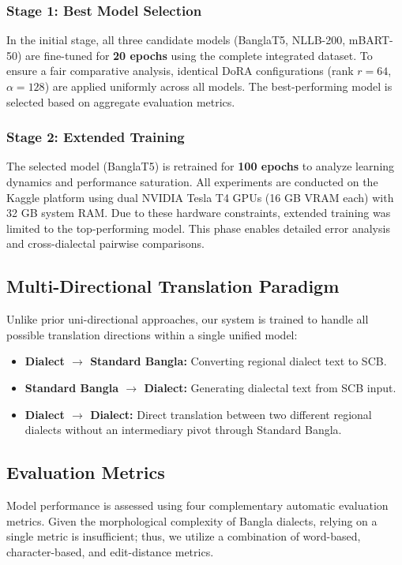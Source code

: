 \documentclass[12pt,a4paper]{article}
\begin{document}
\subsubsection{Stage 1: Best Model Selection}
In the initial stage, all three candidate models (BanglaT5, NLLB-200, mBART-50) are fine-tuned for \textbf{20 epochs} using the complete integrated dataset. To ensure a fair comparative analysis, identical DoRA configurations (rank $r = 64$, $\alpha = 128$) are applied uniformly across all models. The best-performing model is selected based on aggregate evaluation metrics.

\subsubsection{Stage 2: Extended Training}
The selected model (BanglaT5) is retrained for \textbf{100 epochs} to analyze learning dynamics and performance saturation. All experiments are conducted on the Kaggle platform using dual NVIDIA Tesla T4 GPUs (16 GB VRAM each) with 32 GB system RAM. Due to these hardware constraints, extended training was limited to the top-performing model. This phase enables detailed error analysis and cross-dialectal pairwise comparisons.

\subsection{Multi-Directional Translation Paradigm}
Unlike prior uni-directional approaches, our system is trained to handle all possible translation directions within a single unified model:
\begin{itemize}
    \item \textbf{Dialect $\rightarrow$ Standard Bangla:} Converting regional dialect text to SCB.
    \item \textbf{Standard Bangla $\rightarrow$ Dialect:} Generating dialectal text from SCB input.
    \item \textbf{Dialect $\rightarrow$ Dialect:} Direct translation between two different regional dialects without an intermediary pivot through Standard Bangla.
\end{itemize}

\subsection{Evaluation Metrics}
Model performance is assessed using four complementary automatic evaluation metrics. Given the morphological complexity of Bangla dialects, relying on a single metric is insufficient; thus, we utilize a combination of word-based, character-based, and edit-distance metrics.
\end{document}
